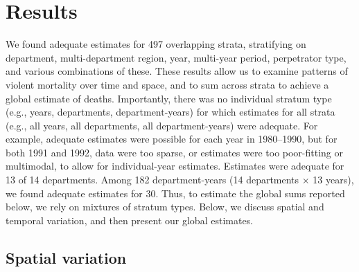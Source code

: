 \documentclass[11pt,]{article}
\begin{document}
\hypertarget{results}{%
\section{Results}\label{results}}

We found adequate estimates for 497 overlapping strata, stratifying on
department, multi-department region, year, multi-year period,
perpetrator type, and various combinations of these. These results allow
us to examine patterns of violent mortality over time and space, and to
sum across strata to achieve a global estimate of deaths. Importantly,
there was no individual stratum type (e.g., years, departments,
department-years) for which estimates for all strata (e.g., all years,
all departments, all department-years) were adequate. For example,
adequate estimates were possible for each year in 1980--1990, but for
both 1991 and 1992, data were too sparse, or estimates were too
poor-fitting or multimodal, to allow for individual-year estimates.
Estimates were adequate for 13 of 14 departments. Among 182
department-years (14 departments \(\times\) 13 years), we found adequate
estimates for 30. Thus, to estimate the global sums reported below, we
rely on mixtures of stratum types. Below, we discuss spatial and
temporal variation, and then present our global estimates.

\hypertarget{spatial-variation}{%
\subsection{Spatial variation}\label{spatial-variation}}
\end{document}
